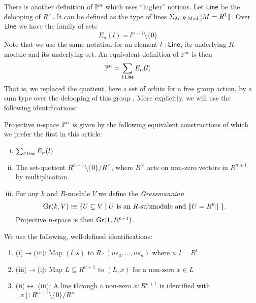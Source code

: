There is another definition of $\mathbb{P}^n$ which uses ``higher'' notions. Let $\mathsf{Line}$ be the delooping
of $R^\times$. It can be defined as the type of lines $\Sigma_{M:R\text{-}\mathrm{Mod}}\|{M=R^1}\|$. Over $\mathsf{Line}$ we have the
family of sets
$$E_n(l) = l^{n+1}\setminus\{0\}$$
Note that we use the same notation for an element $l : \mathsf{Line}$,
its underlying $R$-module and its underlying set.
An equivalent definition of $\mathbb{P}^n$ is then
$$
\mathbb{P}^n = \sum_{l:\mathsf{Line}}E_n(l)
$$
That is, we replaced the quotient, here a set of orbits for a free group action, by a sum type over the delooping of this group
\cite{Sym}.
More explicitly, we will use the following identifications:
\begin{remark}\label{identification-Pn}
  Projective $n$-space $\mathbb{P}^n$ is given by the following equivalent constructions of which we prefer
  the first in this article:
  \begin{center}
  
    \begin{enumerate}[(i)]
    \item $\sum_{l:\mathsf{Line}}E_n(l)$
    \item The set-quotient $R^{n+1}\setminus\{0\}/R^\times$, where $R^\times$ acts on non-zero vectors in $R^{n+1}$ by multiplication.
    \item For any $k$ and $R$-module $V$ we define the \emph{Grassmannian}
      \[ \Gr(k,V)\colonequiv \{ U\subseteq V \mid \text{$U$ is an $R$-submodule and $\|U=R^k\|$ }\} \rlap{.}\]
      Projective $n$-space is then $\mathrm{Gr}(1,R^{n+1})$.
    \end{enumerate}
    
  \end{center}
  We use the following, well-defined identifications:
  \begin{center}
  
  \begin{enumerate}
  \item[] (i)$\to$(iii): Map $(l,s)$ to $R\cdot (u s_0,\dots, u s_n)$ where $u:l=R^1$
  \item[] (iii)$\to $(i): Map $L\subseteq R^{n+1}$ to $(L, x)$ for a non-zero $x\in L$
  \item[] (ii)$\leftrightarrow$ (iii): A line through a non-zero $x:R^{n+1}$
          is identified with $[x]:R^{n+1}\setminus\{0\}/R^\times$
  \end{enumerate}
    
  \end{center}
\end{remark}


